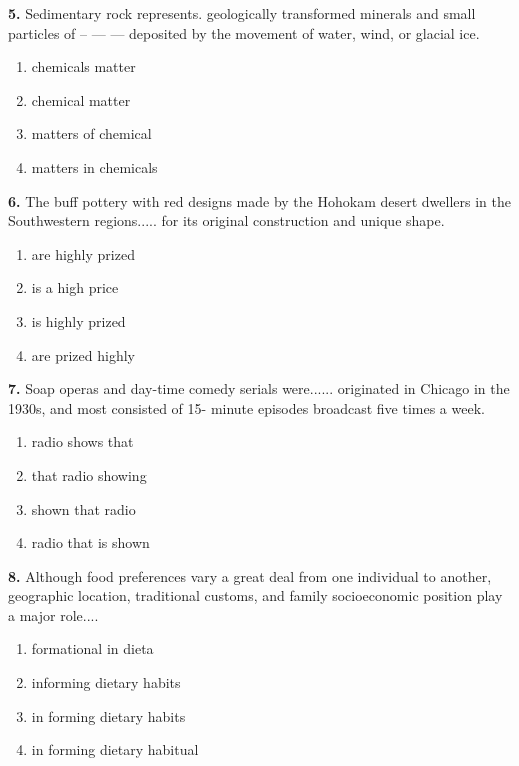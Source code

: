 \documentclass[12pt]{article}
\begin{document}
\par
\vspace{0.25\baselineskip}
\noindent\textbf{5.} Sedimentary rock represents. geologically transformed minerals and small particles of -- --- --- deposited by the movement of water, wind, or glacial ice.
\begin{enumerate}[label=(\Alph*),leftmargin=*,itemsep=0.2em]
\item chemicals matter
\item chemical matter
\item matters of chemical
\item matters in chemicals
\end{enumerate}
\par
\vspace{0.25\baselineskip}
\noindent\textbf{6.} The buff pottery with red designs made by the Hohokam desert dwellers in the Southwestern regions..... for its original construction and unique shape.
\begin{enumerate}[label=(\Alph*),leftmargin=*,itemsep=0.2em]
\item are highly prized
\item is a high price
\item is highly prized
\item are prized highly
\end{enumerate}
\par
\vspace{0.25\baselineskip}
\noindent\textbf{7.} Soap operas and day-time comedy serials were...... originated in Chicago in the 1930s, and most consisted of 15- minute episodes broadcast five times a week.
\begin{enumerate}[label=(\Alph*),leftmargin=*,itemsep=0.2em]
\item radio shows that
\item that radio showing
\item shown that radio
\item radio that is shown
\end{enumerate}
\par
\vspace{0.25\baselineskip}
\noindent\textbf{8.} Although food preferences vary a great deal from one individual to another, geographic location, traditional customs, and family socioeconomic position play a major role....
\begin{enumerate}[label=(\Alph*),leftmargin=*,itemsep=0.2em]
\item formational in dieta
\item informing dietary habits
\item in forming dietary habits
\item in forming dietary habitual
\end{enumerate}
\end{document}
